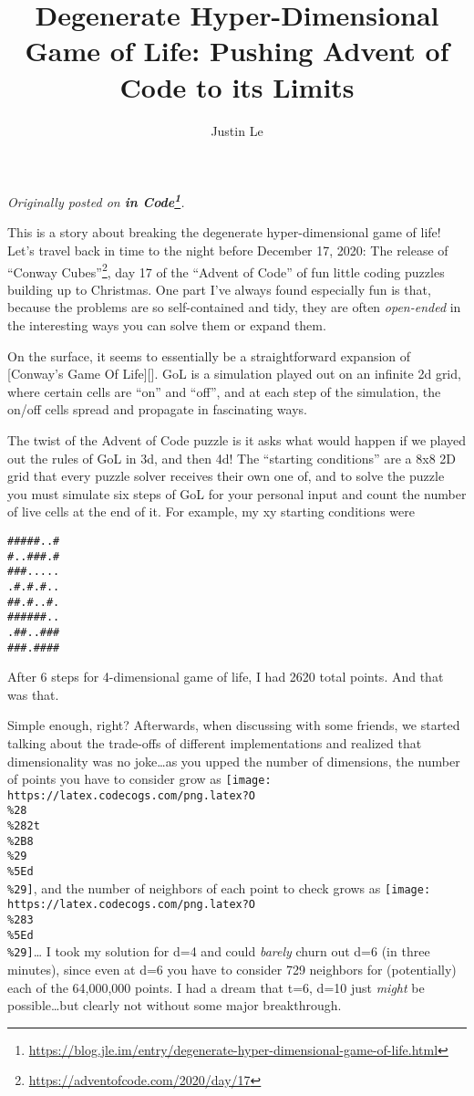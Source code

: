 \documentclass[]{article}
\title{Degenerate Hyper-Dimensional Game of Life: Pushing Advent of Code to its Limits}
\author{Justin Le}
\renewcommand{\href}[2]{#2\footnote{\url{#1}}}
\begin{document}
\maketitle

\emph{Originally posted on
\textbf{\href{https://blog.jle.im/entry/degenerate-hyper-dimensional-game-of-life.html}{in
Code}}.}

This is a story about breaking the degenerate hyper-dimensional game of life!
Let's travel back in time to the night before December 17, 2020: The release of
\href{https://adventofcode.com/2020/day/17}{``Conway Cubes''}, day 17 of the
``Advent of Code'' of fun little coding puzzles building up to Christmas. One
part I've always found especially fun is that, because the problems are so
self-contained and tidy, they are often \emph{open-ended} in the interesting
ways you can solve them or expand them.

On the surface, it seems to essentially be a straightforward expansion of
{[}Conway's Game Of Life{]}{[}{]}. GoL is a simulation played out on an infinite
2d grid, where certain cells are ``on'' and ``off'', and at each step of the
simulation, the on/off cells spread and propagate in fascinating ways.

The twist of the Advent of Code puzzle is it asks what would happen if we played
out the rules of GoL in 3d, and then 4d! The ``starting conditions'' are a 8x8
2D grid that every puzzle solver receives their own one of, and to solve the
puzzle you must simulate six steps of GoL for your personal input and count the
number of live cells at the end of it. For example, my xy starting conditions
were

\begin{verbatim}
#####..#
#..###.#
###.....
.#.#.#..
##.#..#.
######..
.##..###
###.####
\end{verbatim}

After 6 steps for 4-dimensional game of life, I had 2620 total points. And that
was that.

Simple enough, right? Afterwards, when discussing with some friends, we started
talking about the trade-offs of different implementations and realized that
dimensionality was no joke\ldots as you upped the number of dimensions, the
number of points you have to consider grow as
\texttt{[image: https://latex.codecogs.com/png.latex?O\\\%28\\\%282t\\\%2B8\\\%29\\\%5Ed\\\%29]},
and the number of neighbors of each point to check grows as
\texttt{[image: https://latex.codecogs.com/png.latex?O\\\%283\\\%5Ed\\\%29]}\ldots{} I
took my solution for d=4 and could \emph{barely} churn out d=6 (in three
minutes), since even at d=6 you have to consider 729 neighbors for (potentially)
each of the 64,000,000 points. I had a dream that t=6, d=10 just \emph{might} be
possible\ldots but clearly not without some major breakthrough.
\end{document}
